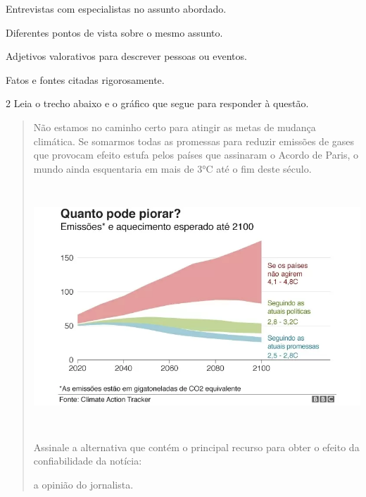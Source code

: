 \begin{escolha}

  \item Entrevistas com especialistas no assunto abordado.
  \item Diferentes pontos de vista sobre o mesmo assunto.
  \item Adjetivos valorativos para descrever pessoas ou eventos.
  \item Fatos e fontes citadas rigorosamente. 

\end{escolha}


\num{2} Leia o trecho abaixo e o gráfico que segue para responder à questão.

\begin{quote}

Não estamos no caminho certo para atingir as metas de mudança
climática. Se somarmos todas as promessas para reduzir emissões de gases
que provocam efeito estufa pelos países que assinaram o Acordo de Paris,
o mundo ainda esquentaria em mais de 3°C até o fim deste século.

\includegraphics[width=5.90551in,height=3.56944in]{./imgSAEB_7_POR/media/image8.png}


Assinale a alternativa que contém o principal recurso para obter o efeito da 
confiabilidade da notícia:

\begin{escolha}

  \item a opinião do jornalista.
  

\end{escolha}
\end{quote}
